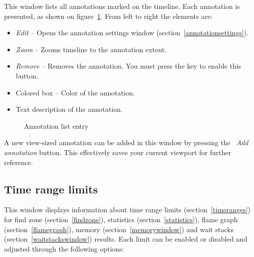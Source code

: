 \documentclass[hidelinks,titlepage,a4paper,twoside]{article}
\begin{document}
This window lists all annotations marked on the timeline. Each annotation is presented, as shown on figure~\ref{figannlist}. From left to right the elements are:

\begin{itemize}
\item \emph{\faEdit{} Edit} -- Opens the annotation settings window (section~\ref{annotationsettings}).
\item \emph{\faMicroscope{} Zoom} -- Zooms timeline to the annotation extent.
\item \emph{\faTrash*{} Remove} -- Removes the annotation. You must press the \keys{\ctrl} key to enable this button.
\item Colored box -- Color of the annotation.
\item Text description of the annotation.
\end{itemize}

\begin{figure}[h]
\centering{}
\caption{Annotation list entry}
\label{figannlist}
\end{figure}

A new view-sized annotation can be added in this window by pressing the \emph{\faPlus{}~Add annotation} button. This effectively saves your current viewport for further reference.

\subsection{Time range limits}
\label{timerangelimits}

This window displays information about time range limits (section~\ref{timeranges}) for find zone (section~\ref{findzone}), statistics (section~\ref{statistics}), flame graph (section~\ref{flamegraph}), memory (section~\ref{memorywindow}) and wait stacks (section~\ref{waitstackswindow}) results. Each limit can be enabled or disabled and adjusted through the following options:
\end{document}
